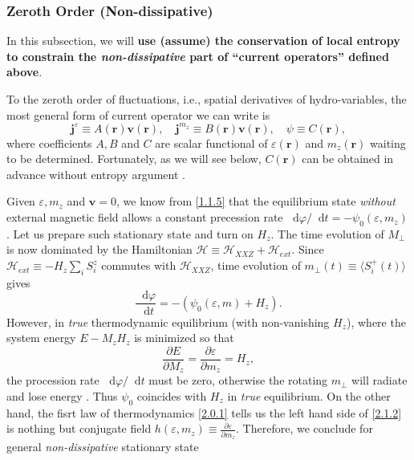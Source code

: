 \documentclass[10pt,nofootinbib]{revtex4}
\newcommand*\dd{\mathop{}\!\mathrm{d}}
\begin{document}
		\subsubsection{Zeroth Order (Non-dissipative)}
			In this subsection, we will {\bf use (assume) the conservation of local entropy to constrain the \emph{non-dissipative} part of ``current operators'' defined above}. \par
			To the zeroth order of fluctuations, i.e., spatial derivatives of hydro-variables, the most general form of current operator we can write is
			\begin{equation}\label{2.1.1}
				\bm{j}^\varepsilon\equiv A(\bm{r})\bm{v}(\bm{r}),\quad \bm{j}^{m_z}\equiv B(\bm{r})\bm{v}(\bm{r}),\quad \psi\equiv C(\bm{r}),
			\end{equation}
			where coefficients $A,B$ and $C$ are scalar functional of $\varepsilon(\bm{r})$ and $m_z(\bm{r})$ waiting to be determined. Fortunately, as we will see below, $C(\bm{r})$ can be obtained in advance without entropy argument \cite{chaikin2000principles,halperin1969hydrodynamic}.\par
			Given $\varepsilon,m_z$ and $\bm{v}=0$, we know from \eqref{1.1.5} that the equilibrium state \emph{without} external magnetic field allows a constant precession rate $\dd\varphi/\dd t=-\psi_0(\varepsilon,m_z)$. Let us prepare such stationary state and turn on $H_z$. The time evolution of $M_\perp$ is now dominated by the Hamiltonian $\mathcal{H}\equiv\mathcal{H}_{XXZ}+\mathcal{H}_{ext}$. Since $\mathcal{H}_{ext}\equiv-H_z\sum_i S_i^z$ commutes with $\mathcal{H}_{XXZ}$, time evolution of $m_\perp(t)\equiv\langle S_i^+(t)\rangle$ gives
			\begin{equation*}
				\dfrac{\dd\varphi}{\dd t}=-(\psi_0(\varepsilon,m)+H_z).
			\end{equation*}
			However, in \emph{true} thermodynamic equilibrium (with non-vanishing $H_z$), where the system energy $E-M_z H_z$ is minimized so that
			\begin{equation}\label{2.1.2}
				\dfrac{\partial E}{\partial M_z}=\dfrac{\partial \varepsilon}{\partial m_z}=H_z,
			\end{equation}
			the procession rate $\dd\varphi/\dd t$ must be zero, otherwise the rotating $m_\perp$ will radiate and lose energy \cite{halperin1969hydrodynamic}. Thus $\psi_0$ coincides with $H_z$ in \emph{true} equilibrium. On the other hand, the fisrt law of thermodynamics \eqref{2.0.1} tells us the left hand side of \eqref{2.1.2} is nothing but conjugate field $h(\varepsilon,m_z)\equiv\frac{\partial \varepsilon}{\partial m_z}$. Therefore, we conclude for general \emph{non-dissipative} stationary state 
\end{document}
